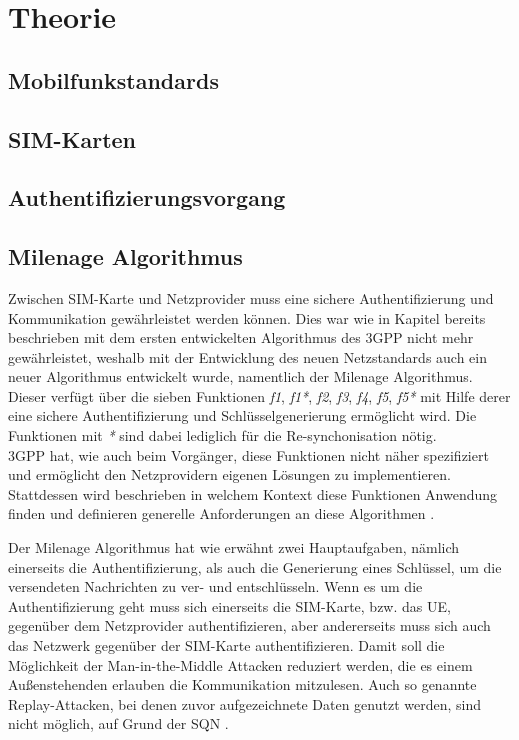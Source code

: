 \clearpage

\section{Theorie}
\label{theorie}

\subsection{Mobilfunkstandards}

\subsection{SIM-Karten}

\subsection{Authentifizierungsvorgang}
\label{authentifizierungsvorgang}

\subsection{Milenage Algorithmus}
\label{milenage}
Zwischen \ac{SIM}-Karte und Netzprovider muss eine sichere Authentifizierung und Kommunikation gewährleistet werden können. Dies war wie in Kapitel  bereits beschrieben mit dem ersten entwickelten Algorithmus des \ac{3GPP} nicht mehr gewährleistet, weshalb mit der Entwicklung des neuen Netzstandards auch ein neuer Algorithmus entwickelt wurde, namentlich der Milenage Algorithmus. \\
Dieser verfügt über die sieben Funktionen \emph{f1}, \emph{f1*}, \emph{f2}, \emph{f3}, \emph{f4}, \emph{f5}, \emph{f5*} mit Hilfe derer eine sichere Authentifizierung und Schlüsselgenerierung ermöglicht wird. Die Funktionen mit \emph{*} sind dabei lediglich für die Re-synchonisation nötig. \\
3GPP hat, wie auch beim Vorgänger, diese Funktionen nicht näher spezifiziert und ermöglicht den Netzprovidern eigenen Lösungen zu implementieren. Stattdessen wird beschrieben in welchem Kontext diese Funktionen Anwendung finden und definieren generelle Anforderungen an diese Algorithmen \cite{3gpp.35.205}.

Der Milenage Algorithmus hat wie erwähnt zwei Hauptaufgaben, nämlich einerseits die Authentifizierung, als auch die Generierung eines Schlüssel, um die versendeten Nachrichten zu ver- und entschlüsseln. Wenn es um die Authentifizierung geht muss sich einerseits die SIM-Karte, bzw. das \ac{UE}, gegenüber dem Netzprovider authentifizieren, aber andererseits muss sich auch das Netzwerk gegenüber der SIM-Karte authentifizieren. Damit soll die Möglichkeit der Man-in-the-Middle Attacken reduziert werden, die es einem Außenstehenden erlauben die Kommunikation mitzulesen. Auch so genannte Replay-Attacken, bei denen zuvor aufgezeichnete Daten genutzt werden, sind nicht möglich, auf Grund der \acl{SQN} \cite{spitz11}.

